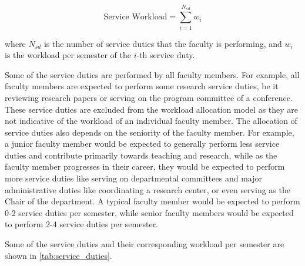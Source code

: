 \begin{equation*}
  \text{Service Workload} = \sum_{i=1}^{N_{sd}} w_i
\end{equation*}

where $N_{sd}$ is the number of service duties that the faculty is performing, and $w_i$ is the workload per semester of the $i$-th service duty.

Some of the service duties are performed by all faculty members. For example, all faculty members are expected to perform some research service duties, be it reviewing research papers or serving on the program committee of a conference. These service duties are excluded from the workload allocation model as they are not indicative of the workload of an individual faculty member. The allocation of service duties also depends on the seniority of the faculty member. For example, a junior faculty member would be expected to generally perform less service duties and contribute primarily towards teaching and research, while as the faculty member progresses in their career, they would be expected to perform more service duties like serving on departmental committees and major administrative duties like coordinating a research center, or even serving as the Chair of the department. A typical faculty member would be expected to perform 0-2 service duties per semester, while senior faculty members would be expected to perform 2-4 service duties per semester.

Some of the service duties and their corresponding workload per semester are shown in \autoref{tab:service_duties}.

